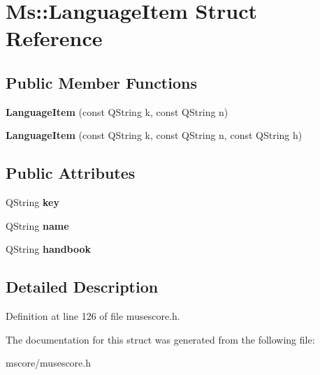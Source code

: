 \hypertarget{struct_ms_1_1_language_item}{}\section{Ms\+:\+:Language\+Item Struct Reference}
\label{struct_ms_1_1_language_item}
\subsection*{Public Member Functions}
\begin{DoxyCompactItemize}
\item 
\mbox{\label{struct_ms_1_1_language_item_a08db85626e452a57b3cf6d52ec31ba65}} 
{\bfseries Language\+Item} (const Q\+String k, const Q\+String n)
\item 
\mbox{\label{struct_ms_1_1_language_item_a3e44c0eff90f5eeb89d4b00d3d972e8a}} 
{\bfseries Language\+Item} (const Q\+String k, const Q\+String n, const Q\+String h)
\end{DoxyCompactItemize}
\subsection*{Public Attributes}
\begin{DoxyCompactItemize}
\item 
\mbox{\label{struct_ms_1_1_language_item_aa0ce49a6a41cd077d64f9bfa56b64193}} 
Q\+String {\bfseries key}
\item 
\mbox{\label{struct_ms_1_1_language_item_a9ddb9429571d97e070f0fbb0cce74e64}} 
Q\+String {\bfseries name}
\item 
\mbox{\label{struct_ms_1_1_language_item_a445eff5418b512511dd112340201fd8c}} 
Q\+String {\bfseries handbook}
\end{DoxyCompactItemize}


\subsection{Detailed Description}


Definition at line 126 of file musescore.\+h.



The documentation for this struct was generated from the following file\+:\begin{DoxyCompactItemize}
\item 
mscore/musescore.\+h\end{DoxyCompactItemize}
